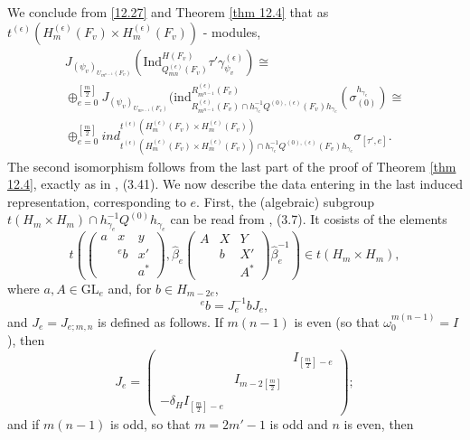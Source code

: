 \documentclass[12pts]{amsart}
\newcommand{\GL}{{\mathrm{GL}}}
\newcommand{\Ind}{{\mathrm{Ind}}}
\newcommand{\ind}{{\mathrm{ind}}}
\begin{document}
We conclude from \eqref{12.27} and Theorem \ref{thm 12.4} that
as $t^{(\epsilon)}(H^{(\epsilon)}_m(F_v)\times H^{(\epsilon)}_m(F_v))$ - modules, 
\begin{multline}\label{12.45}
J_{(\psi_v)_{U_{m^{n-1}}(F_v)}}(\Ind^{H(F_v)}_{Q^{(\epsilon)}_{mn}(F_v)}\tau'\gamma_{\psi_v}^{(\epsilon)})\cong\\ \oplus_{e=0}^{[\frac{m}{2}]}J_{(\psi_v)_{U_{m^{n-1}}(F_v)}}(\ind^{R^{(\epsilon)}_{m^{n-1}}(F_v)}_{R^{(\epsilon)}_{m^{n-1}}(F_v)\cap h_{\gamma_e}^{-1}Q^{(0),(\epsilon)}(F_v)h_{\gamma_e}}(\sigma_{(0)}^{h_{\gamma_e}})\cong \\ \oplus_{e=0}^{[\frac{m}{2}]}ind^{t^{(\epsilon)}(H^{(\epsilon)}_m(F_v)\times H^{(\epsilon)}_m(F_v))}_{t^{(\epsilon)}(H^{(\epsilon)}_m(F_v)\times H^{(\epsilon)}_m(F_v))\cap h_{\gamma_e}^{-1}Q^{(0),(\epsilon)}(F_v)h_{\gamma_e}}\sigma_{[\tau',e]}.
\end{multline}
The second isomorphism follows from the last part of the proof of Theorem \ref{thm 12.4}, exactly as in \cite{GJS15}, (3.41).	
We now describe the data entering in the last induced representation, corresponding to $e$. First, the (algebraic) subgroup $t(H_m\times H_m)\cap h_{\gamma_e}^{-1}Q^{(0)}h_{\gamma_e}$ can be read from \cite{GS18}, (3.7). It cosists of the elements
\begin{equation}\label{12.46}
t(\begin{pmatrix}a&x&y\\&{}^eb&x'\\&&a^*\end{pmatrix},\hat{\beta}_e\begin{pmatrix}A&X&Y\\&b&X'\\&&A^*\end{pmatrix}\hat{\beta}_e^{-1})\in
t(H_m\times H_m),
\end{equation}
where $a, A\in \GL_e$ and, for $b\in H_{m-2e}$,
\begin{equation}\label{12.47}
{}^eb=J^{-1}_e b J_e,
\end{equation}
and $J_e=J_{e;m,n}$ is defined as follows. If $m(n-1)$ is even (so that $\omega_0^{m(n-1)}=I$), then
\begin{equation}\label{12.48} 
J_e=\begin{pmatrix}&&I_{[\frac{m}{2}]-e}\\&I_{m-2[\frac{m}{2}]}\\-\delta_H
I_{[\frac{m}{2}]-e}\end{pmatrix};
\end{equation}
and if $m(n-1)$ is odd, so that $m=2m'-1$ is odd and $n$ is even, then
\end{document}
